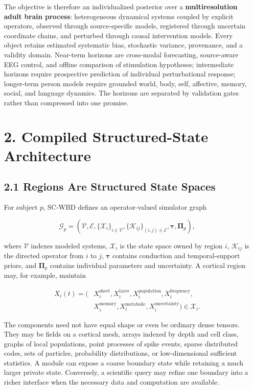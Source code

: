The objective is therefore an individualized posterior over a
\textbf{multiresolution adult brain process}: heterogeneous dynamical systems
coupled by explicit operators, observed through source-specific models,
registered through uncertain coordinate chains, and perturbed through causal
intervention models. Every object retains estimated systematic bias,
stochastic variance, provenance, and a validity domain. Near-term horizons are
cross-modal forecasting, source-aware EEG control, and offline comparison of
stimulation hypotheses; intermediate horizons require prospective prediction
of individual perturbational response; longer-term person models require
grounded world, body, self, affective, memory, social, and language dynamics.
The horizons are separated by validation gates rather than compressed into
one promise.

\section{2. Compiled Structured-State Architecture}

\subsection{2.1 Regions Are Structured State Spaces}

For subject \(p\), SC-WBD defines an operator-valued simulator graph

\[
\mathcal{G}_p =
\left(\mathcal{V},\mathcal{E},
\{\mathcal{X}_i\}_{i\in\mathcal{V}},
\{\mathcal{K}_{ij}\}_{(i,j)\in\mathcal{E}},
\boldsymbol{\tau},\boldsymbol{\Pi}_p\right),
\]

where \(\mathcal{V}\) indexes modeled systems, \(\mathcal{X}_i\) is the state
space owned by region \(i\), \(\mathcal{K}_{ij}\) is the directed operator from
\(i\) to \(j\), \(\boldsymbol{\tau}\) contains conduction and temporal-support
priors, and \(\boldsymbol{\Pi}_p\) contains individual parameters and
uncertainty. A cortical region may, for example, maintain

\[
\begin{aligned}
X_i(t)=\bigl(&X_i^{\mathrm{sheet}},
X_i^{\mathrm{layer}},
X_i^{\mathrm{population}},
X_i^{\mathrm{frequency}},\\
&X_i^{\mathrm{memory}},
X_i^{\mathrm{metabolic}},
X_i^{\mathrm{uncertainty}}\bigr)\in\mathcal{X}_i .
\end{aligned}
\]

The components need not have equal shape or even be ordinary dense tensors.
They may be fields on a cortical mesh, arrays indexed by depth and cell class,
graphs of local populations, point processes of spike events, sparse
distributed codes, sets of particles, probability distributions, or
low-dimensional sufficient statistics. A module can expose a coarse boundary
state while retaining a much larger private state. Conversely, a scientific
query may refine one boundary into a richer interface when the necessary data
and computation are available.

